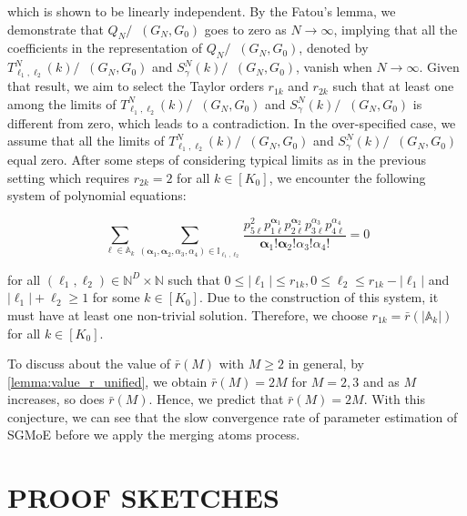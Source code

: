 \documentclass[twoside]{article}
\DeclareMathOperator*{\VDFRA}{D_{FRA}}
\theoremstyle{plain}
\theoremstyle{definition}
\theoremstyle{plain}
\def\valpha{{\bm{\alpha}}}
\def\sA{{\mathbb{A}}}
\def\sI{{\mathbb{I}}}
\begin{document}
which is shown to be linearly independent. By the Fatou's lemma, we demonstrate that $Q_{N} / \VDFRA\left(G_{N}, G_{0}\right)$ goes to zero as $N \rightarrow \infty$, implying that all the coefficients in the representation of $Q_{N} / \VDFRA\left(G_{N}, G_{0}\right)$, denoted by $T_{\ell_{1}, \ell_{2}}^N(k) / \VDFRA\left(G_{N}, G_{0}\right)$ and $S_{\gamma}^N(k) / \VDFRA\left(G_{N}, G_{0}\right)$, vanish when $N \rightarrow \infty$. Given that result, we aim to select the Taylor orders $r_{1 k}$ and $r_{2 k}$ such that at least one among the limits of $T_{\ell_{1}, \ell_{2}}^N(k) / \VDFRA\left(G_{N}, G_{0}\right)$ and $S_{\gamma}^N(k) / \VDFRA\left(G_{N}, G_{0}\right)$ is different from zero, which leads to a contradiction. In the over-specified case, we assume that all the limits of $T_{\ell_{1}, \ell_{2}}^N(k) / \VDFRA\left(G_{N}, G_{0}\right)$ and $S_{\gamma}^N(k) / \VDFRA\left(G_{N}, G_{0}\right)$ equal zero. After some steps of considering typical limits as in the previous setting which requires $r_{2 k}=2$ for all $k \in\left[K_{0}\right]$, we encounter the following system of polynomial equations:

$$
\sum_{\ell \in \sA_{k}} \sum_{\left(\valpha_{1}, \valpha_{2}, \alpha_{3}, \alpha_{4}\right) \in \sI_{\ell_{1}, \ell_{2}}} \frac{p_{5 \ell}^{2} p_{1 \ell}^{\valpha_{1}} p_{2 \ell}^{\valpha_{2}} p_{3 \ell}^{\alpha_{3}} p_{4 \ell}^{\alpha_{4}}}{\valpha_{1}!\valpha_{2}!\alpha_{3}!\alpha_{4}!}=0
$$

for all $\left(\ell_{1}, \ell_{2}\right) \in \mathbb{N}^{D} \times \mathbb{N}$ such that $0 \leq\left|\ell_{1}\right| \leq r_{1 k}, 0 \leq \ell_{2} \leq r_{1 k}-\left|\ell_{1}\right|$ and $\left|\ell_{1}\right|+\ell_{2} \geq 1$ for some $k \in\left[K_{0}\right]$. Due to the construction of this system, it must have at least one non-trivial solution. Therefore, we choose $r_{1 k} = \bar{r} (|\sA_k|)$ for all $k \in [K_0]$.

To discuss about the value of $\bar{r} (M)$ with $M \ge 2$ in general, by \cref{lemma:value_r_unified}, we obtain $\bar{r} (M) = 2M$ for $M = 2, 3$ and as $M$ increases, so does $\bar{r} (M)$. Hence, we predict that $\bar{r} (M) = 2M$. With this conjecture, we can see that the slow convergence rate of parameter estimation of SGMoE before we apply the merging atoms process.

\section{PROOF SKETCHES}\label{sec:appendix:proof-sketches}
\end{document}
